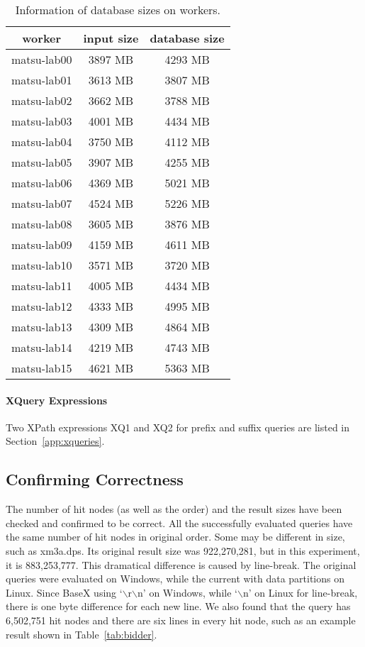 \begin{table}
	\centering
	\label{tab:dbinfo}
	\caption{Information of database sizes on workers.}
	\begin{tabular}{c|c|c}
		\hline
		worker &  input size & database size \\
		\hline
		matsu-lab00 & 3897 MB & 4293 MB \\
		matsu-lab01 & 3613 MB & 3807 MB \\
		matsu-lab02 & 3662 MB & 3788 MB \\
		matsu-lab03 & 4001 MB & 4434 MB \\
		matsu-lab04 & 3750 MB & 4112 MB \\
		matsu-lab05 & 3907 MB & 4255 MB \\
		matsu-lab06 & 4369 MB & 5021 MB \\
		matsu-lab07 & 4524 MB & 5226 MB \\
		matsu-lab08 & 3605 MB & 3876 MB \\
		matsu-lab09 & 4159 MB & 4611 MB \\
		matsu-lab10 & 3571 MB & 3720 MB \\
		matsu-lab11 & 4005 MB & 4434 MB \\
		matsu-lab12 & 4333 MB & 4995 MB \\
		matsu-lab13 & 4309 MB & 4864 MB \\
		matsu-lab14 & 4219 MB & 4743 MB \\
		matsu-lab15 & 4621 MB & 5363 MB \\
		\hline
	\end{tabular}
\end{table}




\paragraph{XQuery Expressions}

Two XPath expressions XQ1 and XQ2 for prefix and suffix queries
are listed in Section~\ref{app:xqueries}.



\subsection{Confirming Correctness}
\label{sec:correctness}

The number of hit nodes (as well as the order) and 
the result sizes have been 
checked and confirmed to be correct.
All the successfully evaluated queries
have the same number of hit nodes in original order. Some may be
different in size, such as xm3a.dps. Its original result size
was 922,270,281, but in this experiment, it is 883,253,777.
This dramatical difference is caused by line-break. The original
queries were evaluated on Windows, while the current with data partitions 
on Linux. Since BaseX using `$\backslash$r$\backslash$n' on Windows, while
`$\backslash$n' on Linux for line-break, there is one byte
difference for each new line. We also found that the query has
6,502,751 hit nodes and  there are six lines in every hit node,
such as an example result shown in Table~\ref{tab:bidder}.\\

